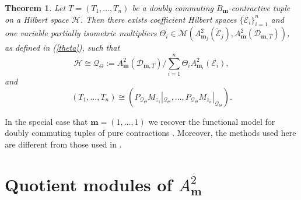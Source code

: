\documentclass[12pt]{amsart}
\newtheorem{Theorem}{\sc Theorem}[section]
\begin{document}
\begin{Theorem}\label{min-dil}
Let $T = (T_1, \ldots, T_n)$ be a doubly commuting
$B_{\bm{m}}$-contractive tuple on a Hilbert space ${\mathcal{H}}$. Then there
exists coefficient Hilbert spaces $\{{\mathcal{E}}_i\}_{i=1}^n$ and one
variable partially isometric multipliers $\Theta_i \in
{\mathcal{M}}(A^2_{{\bm{m}}_j}(\tilde{\mathcal{E}}_j), A^2_{\bm{m}}({\mathcal{D}}_{{\bm{m}}, T}))$, as
defined in (\ref{theta}), such that \[{\mathcal{H}} \cong {\mathcal{Q}}_{\Theta} :=
A^2_{\bm{m}}({\mathcal{D}}_{{\bm{m}},T})/ \sum_{i=1}^n \Theta_i
A^2_{{\bm{m}}_i}({\mathcal{E}}_i),\]and
\[(T_1, \ldots, T_n) \cong (P_{{\mathcal{Q}}_{\Theta}}
M_{z_1}|_{{\mathcal{Q}}_{\Theta}}, \ldots, P_{{\mathcal{Q}}_{\Theta}}
M_{z_n}|_{{\mathcal{Q}}_{\Theta}}).\]
\end{Theorem}

In the special case that ${\bm{m}} = (1, \ldots, 1)$ we recover the functional model for doubly commuting tuples of pure contractions \cite{BNS}. Moreover, the methods
used here are different from those used in \cite{BNS}.

{\setcounter{equation}{0} \section{{Quotient modules of $A^2_{\bm{m}}$}}}\label{qm}
\end{document}
